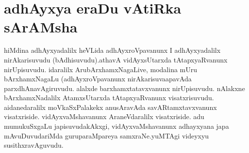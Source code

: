 \chapter{adhAyxya eraDu vAtiRka sArAMsha}


\centerline{}

\begin{artha}
hiMdina adhAyxyadalilx heVLida adhAyxroVpavanunx I adhAyxyadalilx nirAkarisuvudu (bAdhisuvudu).athavA vidAyxsUtarxda tAtapxyaRvanunx nirUpisuvudu. idaralilx ArubArxhamxNagaLive, modalina mUru bArxhamxNagaLu (adhAyxroVpavanunx nirAkarisuvaapavAda parxdhAnavAgiruvudu. alalxde barxhamxtatavxvanunx nirUpisuvudu. nAlakxne bArxhamxNadalilx AtamxsUtarxda tAtapxyaRvanunx visatxrisuvudu. aidanedaralilx moVkaSxPalakekx anusAravAda savARtamxtavxvanunx visatxriside. vidAyxvaMshavanunx AraneVdaralilx visatxriside. adu mumukuSxgaLu japisuvudakAkxgi, vidAyxvaMshavanunx adhayxyana japa mAvuDuvudariMda guruparaMpareya samxraNe.yuMTAgi videyxyu susithxravAguvudu.
\end{artha}

\centerline{}

